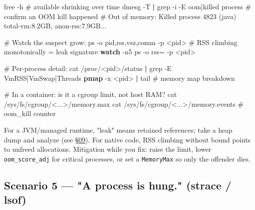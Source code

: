 \documentclass[11pt]{article}
\newenvironment{Shaded}{\begin{snugshade}}{\end{snugshade}}
\newcommand{\AttributeTok}[1]{\textcolor[rgb]{0.16,0.50,0.73}{#1}}
\newcommand{\CommentTok}[1]{\textcolor[rgb]{0.48,0.49,0.49}{#1}}
\newcommand{\ExtensionTok}[1]{\textcolor[rgb]{0.00,0.60,1.00}{\textbf{#1}}}
\newcommand{\FunctionTok}[1]{\textcolor[rgb]{0.56,0.27,0.68}{#1}}
\newcommand{\KeywordTok}[1]{\textcolor[rgb]{0.81,0.81,0.76}{\textbf{#1}}}
\newcommand{\NormalTok}[1]{\textcolor[rgb]{0.81,0.81,0.76}{#1}}
\newcommand{\OperatorTok}[1]{\textcolor[rgb]{0.81,0.81,0.76}{#1}}
\newcommand{\StringTok}[1]{\textcolor[rgb]{0.96,0.31,0.31}{#1}}
\begin{document}

\begin{Shaded}
\begin{Highlighting}[]
\FunctionTok{free} \AttributeTok{{-}h}                        \CommentTok{\# available shrinking over time}
\FunctionTok{dmesg} \AttributeTok{{-}T} \KeywordTok{|} \FunctionTok{grep} \AttributeTok{{-}i} \AttributeTok{{-}E} \StringTok{\textquotesingle{}oom|killed process\textquotesingle{}}   \CommentTok{\# confirm an OOM kill happened}
\CommentTok{\#   Out of memory: Killed process 4823 (java) total{-}vm:8.2GB, anon{-}rss:7.9GB...}

\CommentTok{\# Watch the suspect grow:}
\FunctionTok{ps} \AttributeTok{{-}o}\NormalTok{ pid,rss,vsz,comm }\AttributeTok{{-}p} \OperatorTok{\textless{}}\NormalTok{pid}\OperatorTok{\textgreater{}}     \CommentTok{\# RSS climbing monotonically = leak signature}
\ExtensionTok{watch} \AttributeTok{{-}n5} \StringTok{\textquotesingle{}ps {-}o rss= {-}p \textless{}pid\textgreater{}\textquotesingle{}}

\CommentTok{\# Per{-}process detail:}
\FunctionTok{cat}\NormalTok{ /proc/}\OperatorTok{\textless{}}\NormalTok{pid}\OperatorTok{\textgreater{}}\NormalTok{/status }\KeywordTok{|} \FunctionTok{grep} \AttributeTok{{-}E} \StringTok{\textquotesingle{}VmRSS|VmSwap|Threads\textquotesingle{}}
\ExtensionTok{pmap} \AttributeTok{{-}x} \OperatorTok{\textless{}}\NormalTok{pid}\OperatorTok{\textgreater{}} \KeywordTok{|} \FunctionTok{tail}            \CommentTok{\# memory map breakdown}

\CommentTok{\# In a container: is it a cgroup limit, not host RAM?}
\FunctionTok{cat}\NormalTok{ /sys/fs/cgroup/}\OperatorTok{\textless{}}\NormalTok{...}\OperatorTok{\textgreater{}}\NormalTok{/memory.max}
\FunctionTok{cat}\NormalTok{ /sys/fs/cgroup/}\OperatorTok{\textless{}}\NormalTok{...}\OperatorTok{\textgreater{}}\NormalTok{/memory.events   }\CommentTok{\# \textquotesingle{}oom\_kill\textquotesingle{} counter}
\end{Highlighting}
\end{Shaded}

For a JVM/managed runtime, "leak" means retained references; take a heap dump and analyze (see \hyperlink{section.09}{\textcolor{acc}{§09}}). For native code, RSS climbing without bound points to unfreed allocations. Mitigation while you fix: raise the limit, lower \texttt{oom\_score\_adj} for critical processes, or set a \texttt{MemoryMax} so only the offender dies.

\subsection{Scenario 5 --- "A process is hung." (strace / lsof)}\label{scenario-5--a-process-is-hung-strace--lsof}
\end{document}
